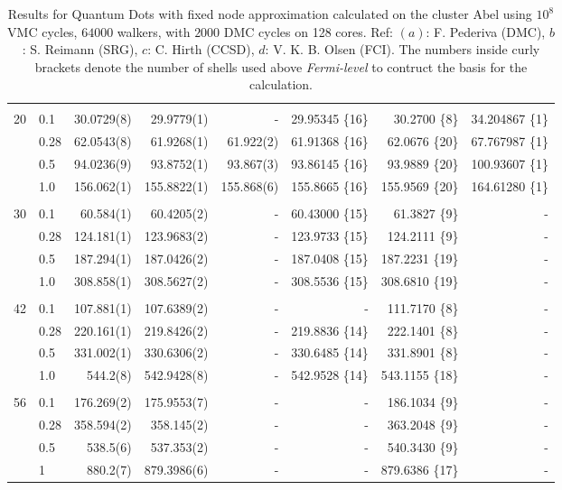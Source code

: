 \begin{table}
\begin{center}
\begin{tabular}{rl|rrrrrr}
\cline{2-8}
\multicolumn{8}{c}{} \\
    20    &   0.1    &  30.0729(8)  &  29.9779(1) & -		&29.95345 \{16\}	& 30.2700 \{8\} & 34.204867 \{1\}\\
          &   0.28   &  62.0543(8)  &  61.9268(1) & 61.922(2) &61.91368 \{16\}	& 62.0676 \{20\} & 67.767987 \{1\}\\
          &   0.5    &  94.0236(9)  &  93.8752(1) & 93.867(3) &93.86145 \{16\}	& 93.9889 \{20\} & 100.93607 \{1\}\\
          &   1.0    & 156.062(1)   & 155.8822(1) & 155.868(6)&155.8665 \{16\}	& 155.9569 \{20\}& 164.61280 \{1\}\\
\cline{2-8}
\multicolumn{8}{c}{} \\
    30    &   0.1    &  60.584(1)  &  60.4205(2)  & -		&60.43000 \{15\}	&  61.3827 \{9\}& -\\
          &   0.28   & 124.181(1)  & 123.9683(2)  & - 		&123.9733 \{15\}	& 124.2111 \{9\}& -\\
          &   0.5    & 187.294(1)  & 187.0426(2)  & - 		&187.0408 \{15\}	& 187.2231 \{19\}& -\\
          &   1.0    & 308.858(1)  & 308.5627(2)  & -	 	&308.5536 \{15\}	& 308.6810 \{19\}& -\\
\cline{2-8}
\multicolumn{8}{c}{} \\
    42    &   0.1    & 107.881(1)  & 107.6389(2)  & - 		&- 			& 111.7170 \{8\}& -\\
          &   0.28   & 220.161(1)  & 219.8426(2)  & - 		&219.8836 \{14\}	& 222.1401 \{8\}& -\\
          &   0.5    & 331.002(1)  & 330.6306(2)  & - 		&330.6485 \{14\}	& 331.8901 \{8\}& -\\
          &   1.0    & 544.2(8)    & 542.9428(8)  & - 		&542.9528 \{14\}	& 543.1155 \{18\}& -\\
\cline{2-8}
\multicolumn{8}{c}{} \\
    56    &   0.1    & 176.269(2) & 175.9553(7)   & -		& -		& 186.1034 \{9\} & -		\\
          &   0.28   & 358.594(2) & 358.145(2)    & -		& -		& 363.2048 \{9\} & -		\\
          &   0.5    & 538.5(6)   & 537.353(2)    & -		& -		& 540.3430 \{9\} & -		\\
          &   1      & 880.2(7)   & 879.3986(6)   & -		& -		& 879.6386 \{17\}& -		\\
\hline\hline


\end{tabular}
\caption{Results for Quantum Dots with fixed node approximation calculated on the cluster Abel using $10^8$ VMC cycles, $64000$ walkers, with $2000$ DMC cycles on 128 cores. Ref: $(a)$: F. Pederiva \cite{MagnusArticle} (DMC), $b$: S. Reimann \cite{Sarah} (SRG), $c$: C. Hirth \cite{Hirth} (CCSD), $d$: V. K. B. Olsen \cite{Olsen} (FCI). The numbers inside curly brackets denote the number of shells used above \textit{Fermi-level} to contruct the basis for the calculation.}
\label{tab:QDotsResultsAll}
\end{center}
\end{table}
\setlength{\tabcolsep}{6pt}

